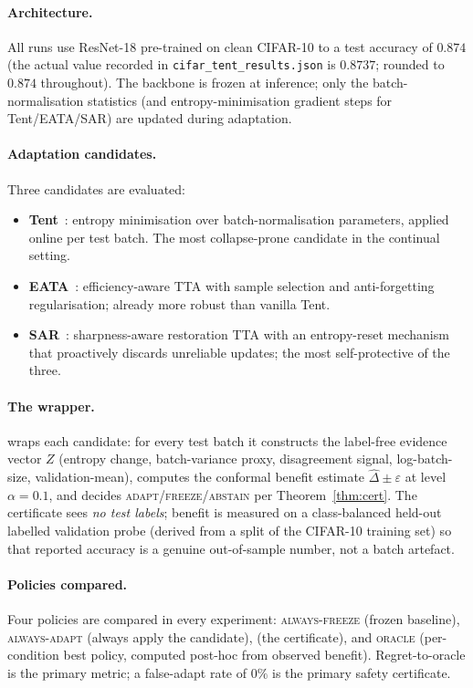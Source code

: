 \paragraph{Architecture.}
All runs use ResNet-18 pre-trained on clean CIFAR-10 to a test accuracy of
$0.874$ (the actual value recorded in \texttt{cifar\_tent\_results.json} is
$0.8737$; rounded to $0.874$ throughout).  The backbone is frozen at
inference; only the batch-normalisation statistics (and entropy-minimisation
gradient steps for Tent/EATA/SAR) are updated during adaptation.

\paragraph{Adaptation candidates.}
Three candidates are evaluated:
\begin{itemize}
\item \textbf{Tent}~\cite{wang2021tent}: entropy minimisation over
  batch-normalisation parameters, applied online per test batch.  The most
  collapse-prone candidate in the continual setting.
\item \textbf{EATA}~\cite{niu2022eata}: efficiency-aware TTA with sample
  selection and anti-forgetting regularisation; already more robust than
  vanilla Tent.
\item \textbf{SAR}~\cite{niu2023sar}: sharpness-aware restoration TTA with
  an entropy-reset mechanism that proactively discards unreliable updates;
  the most self-protective of the three.
\end{itemize}

\paragraph{The \KGA{} wrapper.}
\KGA{} wraps each candidate: for every test batch it constructs the
label-free evidence vector $Z$ (entropy change, batch-variance proxy,
disagreement signal, log-batch-size, validation-mean), computes the
conformal benefit estimate $\widehat{\Delta} \pm \varepsilon$ at level
$\alpha{=}0.1$, and decides \textsc{adapt}/\textsc{freeze}/\textsc{abstain}
per Theorem~\ref{thm:cert}.  The certificate sees \emph{no test labels};
benefit is measured on a class-balanced held-out labelled validation probe
(derived from a split of the CIFAR-10 training set) so that reported
accuracy is a genuine out-of-sample number, not a batch artefact.

\paragraph{Policies compared.}
Four policies are compared in every experiment: \textsc{always-freeze}
(frozen baseline), \textsc{always-adapt} (always apply the candidate),
\textbf{\KGA{}} (the certificate), and \textsc{oracle} (per-condition best
policy, computed post-hoc from observed benefit).  Regret-to-oracle is the
primary metric; a false-adapt rate of $0\%$ is the primary safety
certificate.

